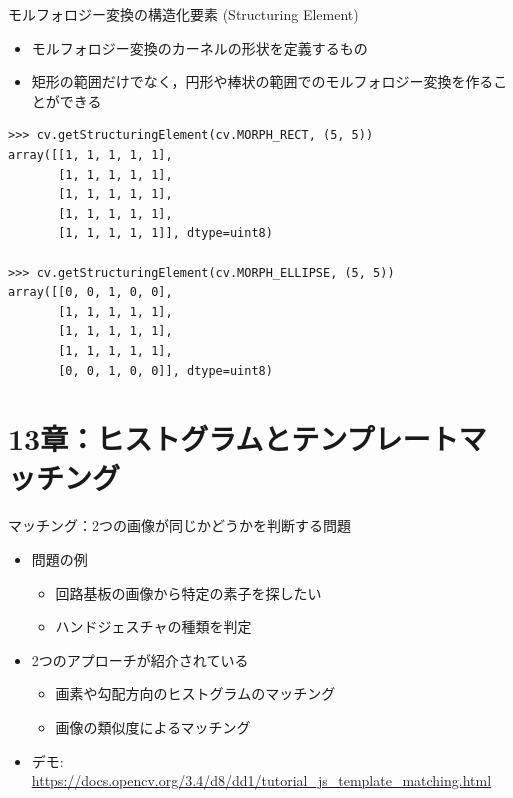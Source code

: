 \documentclass[10pt]{beamer}
\begin{document}
	\begin{frame}[fragile]{モルフォロジー変換の構造化要素 (Structuring Element)}
	    \begin{itemize}
	        \item モルフォロジー変換のカーネルの形状を定義するもの
	        \item 矩形の範囲だけでなく，円形や棒状の範囲でのモルフォロジー変換を作ることができる
	    \end{itemize}
	    \begin{verbatim}
>>> cv.getStructuringElement(cv.MORPH_RECT, (5, 5))
array([[1, 1, 1, 1, 1],
       [1, 1, 1, 1, 1],
       [1, 1, 1, 1, 1],
       [1, 1, 1, 1, 1],
       [1, 1, 1, 1, 1]], dtype=uint8)

>>> cv.getStructuringElement(cv.MORPH_ELLIPSE, (5, 5))
array([[0, 0, 1, 0, 0],
       [1, 1, 1, 1, 1],
       [1, 1, 1, 1, 1],
       [1, 1, 1, 1, 1],
       [0, 0, 1, 0, 0]], dtype=uint8)
	    \end{verbatim}
	\end{frame}
	
	\section{13章：ヒストグラムとテンプレートマッチング}
	
	\begin{frame}{マッチング：2つの画像が同じかどうかを判断する問題}
	    \begin{itemize}
	        \item 問題の例
        	    \begin{itemize}
        	        \item 回路基板の画像から特定の素子を探したい
        	        \item ハンドジェスチャの種類を判定
        	    \end{itemize}
	        \item 2つのアプローチが紹介されている
        	    \begin{itemize}
        	        \item 画素や勾配方向のヒストグラムのマッチング
        	        \item 画像の類似度によるマッチング
        	    \end{itemize}
        	\item デモ: {\tiny \url{https://docs.opencv.org/3.4/d8/dd1/tutorial_js_template_matching.html}}
	    \end{itemize}
	\end{frame}
	
\end{document}
